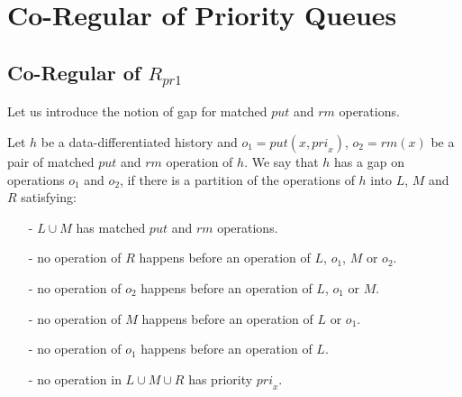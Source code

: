 












































\section{Co-Regular of Priority Queues}
\label{sec:co-regular of priority queues}




\subsection{Co-Regular of $R_{\textit{pr1}}$}
\label{subsec:co-regular of Rpr1}

Let us introduce the notion of gap for matched $\textit{put}$ and $\textit{rm}$ operations.

\begin{definition}\label{def:gap for matched put and rm operations}

Let $h$ be a data-differentiated history and $o_1 = \textit{put}(x,\textit{pri}_x)$, $o_2 = \textit{rm}(x)$ be a pair of matched $\textit{put}$ and $\textit{rm}$ operation of $h$. We say that $h$ has a gap on operations $o_1$ and $o_2$, if there is a partition of the operations of $h$ into $L$, $M$ and $R$ satisfying:
\begin{itemize}
\setlength{\itemsep}{0.5pt}
\item[-] $L \cup M$ has matched $\textit{put}$ and $\textit{rm}$ operations.

\item[-] no operation of $R$ happens before an operation of $L$, $o_1$, $M$ or $o_2$.

\item[-] no operation of $o_2$ happens before an operation of $L$, $o_1$ or $M$.

\item[-] no operation of $M$ happens before an operation of $L$ or $o_1$.

\item[-] no operation of $o_1$ happens before an operation of $L$.

\item[-] no operation in $L \cup M \cup R$ has priority $\textit{pri}_x$.
\end{itemize}
\end{definition}

